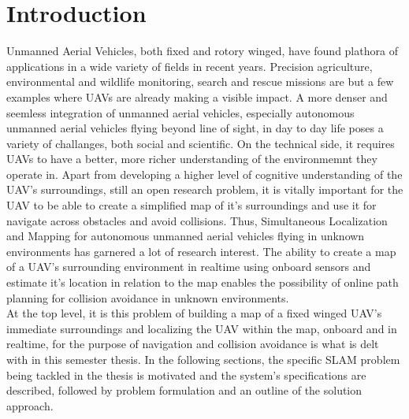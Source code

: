 \chapter{Introduction}
\label{sec:introduction}
Unmanned Aerial Vehicles, both fixed and rotory winged, have found plathora of applications in a wide variety of fields in recent years. Precision agriculture, environmental and  wildlife monitoring, search and rescue missions are but a few examples where UAVs are already making a visible impact. A more denser and seemless integration of unmanned aerial vehicles, especially autonomous unmanned aerial vehicles flying beyond line of sight, in day to day life poses a variety of challanges, both social and scientific. On the technical side, it requires UAVs to have a better, more richer understanding of the environmemnt they operate in. Apart from developing a higher level of cognitive understanding of the UAV's surroundings, still an open research problem, it is vitally important for the UAV to be able to create a simplified map of it's surroundings and use it for navigate across obstacles and avoid collisions. Thus, Simultaneous Localization and Mapping for autonomous unmanned aerial vehicles flying in unknown environments has garnered a lot of research interest. The ability to create a map of a UAV's surrounding environment in realtime using onboard sensors and estimate it's location in relation to the map enables the possibility of online path planning for collision avoidance in unknown environments.\\
At the top level, it is this problem of building a map of a fixed winged UAV's immediate surroundings and localizing the UAV within the map, onboard and in realtime, for the purpose of navigation and collision avoidance is what is delt with in this semester thesis. In the following sections, the specific SLAM problem being tackled in the thesis is motivated and the system's specifications are described, followed by problem formulation and an outline of the solution approach.



